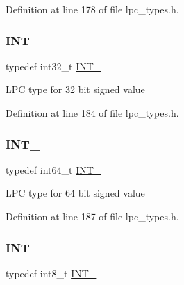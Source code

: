 Definition at line 178 of file lpc\+\_\+types.\+h.

\mbox{\label{group___l_p_c___types___public___types_ga3a17614f3a1b67eaf20781d8ec16a652}} 
\subsubsection{\texorpdfstring{I\+N\+T\+\_}{INT\_32}}
{\footnotesize\ttfamily typedef int32\+\_\+t \hyperlink{group___l_p_c___types___public___types_ga3a17614f3a1b67eaf20781d8ec16a652}{I\+N\+T\+\_}}

L\+PC type for 32 bit signed value 

Definition at line 184 of file lpc\+\_\+types.\+h.

\mbox{\label{group___l_p_c___types___public___types_ga1a0aab29eee6b306564084e005fa5750}} 
\subsubsection{\texorpdfstring{I\+N\+T\+\_}{INT\_64}}
{\footnotesize\ttfamily typedef int64\+\_\+t \hyperlink{group___l_p_c___types___public___types_ga1a0aab29eee6b306564084e005fa5750}{I\+N\+T\+\_}}

L\+PC type for 64 bit signed value 

Definition at line 187 of file lpc\+\_\+types.\+h.

\mbox{\label{group___l_p_c___types___public___types_gac172005ce53b001f50a677cc10bd17b0}} 
\subsubsection{\texorpdfstring{I\+N\+T\+\_}{INT\_8}}
{\footnotesize\ttfamily typedef int8\+\_\+t \hyperlink{group___l_p_c___types___public___types_gac172005ce53b001f50a677cc10bd17b0}{I\+N\+T\+\_}}

